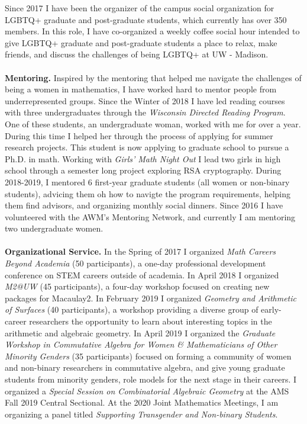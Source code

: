 \documentclass[11pt]{article}
\begin{document}
Since 2017 I have been the organizer of the campus social organization for LGBTQ+ graduate and post-graduate students, which currently has over 350 members. In this role, I have co-organized a weekly coffee social hour intended to give LGBTQ+ graduate and post-graduate students a place to relax, make friends, and discuss the challenges of being LGBTQ+ at UW - Madison.
\\
\\
\noindent \textbf{Mentoring.} Inspired by the mentoring that helped me navigate the challenges of being a women in mathematics, I have worked hard to mentor people from underrepresented groups. Since the Winter of 2018 I have led reading courses with three undergraduates through the \textit{Wisconsin Directed Reading Program}. One of these students, an undergraduate woman, worked with me for over a year. During this time I helped her through the process of applying for summer research projects. This student is now applying to graduate school to pursue a Ph.D. in math. Working with \textit{Girls' Math Night Out} I lead two girls in high school through a semester long project exploring RSA cryptography. During 2018-2019, I mentored 6 first-year graduate students (all women or non-binary students), advicing them oh how to navigte the program requirements, helping them find advisors, and organizing monthly social dinners. Since 2016 I have volunteered with the AWM's Mentoring Network, and currently I am mentoring two undergraduate women.
\\
\\
\noindent \textbf{Organizational Service.}  In the Spring of 2017 I organized \textit{Math Careers Beyond Academia } (50 participants), a one-day professional development conference on STEM careers outside of academia. In April 2018 I organized \textit{M2@UW} (45 participants), a four-day workshop focused on creating new packages for Macaulay2. In February 2019 I organized \textit{Geometry and Arithmetic of Surfaces} (40 participants), a workshop providing a diverse group of early-career researchers the opportunity to learn about interesting topics in the arithmetic and algebraic geometry. In April 2019 I organized the \textit{Graduate Workshop in Commutative Algebra for Women \& Mathematicians of Other Minority Genders} (35 participants)  focused on forming a community of women and non-binary researchers in commutative algebra, and give young graduate students from minority genders, role models for the next stage in their careers. I organized a \textit{Special Session on Combinatorial Algebraic Geometry} at the AMS Fall 2019 Central Sectional. At the 2020 Joint Mathematics Meetings, I am organizing a panel titled \textit{Supporting Transgender and Non-binary Students}. 
\end{document}
